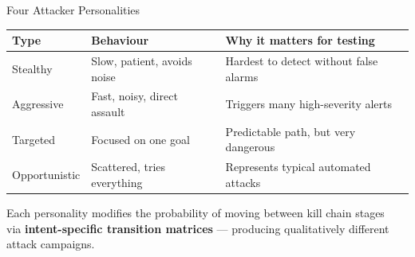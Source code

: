\documentclass[aspectratio=169, 12pt]{beamer}
\begin{document}
\begin{frame}{Four Attacker Personalities}
  \begin{table}
    \centering
    \begin{tabular}{lp{3.5cm}p{5.0cm}}
      \toprule
      \textbf{Type} & \textbf{Behaviour} & \textbf{Why it matters for testing} \\
      \midrule
      Stealthy      & Slow, patient, avoids noise & Hardest to detect without false alarms \\
      Aggressive    & Fast, noisy, direct assault & Triggers many high-severity alerts \\
      Targeted      & Focused on one goal & Predictable path, but very dangerous \\
      Opportunistic & Scattered, tries everything & Represents typical automated attacks \\
      \bottomrule
    \end{tabular}
  \end{table}
  \vspace{0.2cm}
  \begin{center}
    \textcolor{honeygrey}{\small
    Each personality modifies the probability of moving between kill chain stages\\
    via \textbf{intent-specific transition matrices} --- producing qualitatively different attack campaigns.}
  \end{center}
\end{frame}
\end{document}
